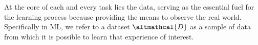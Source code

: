\documentclass[a4paper,12pt,times,numbered,print,index]{Classes/PhDThesisPSnPDF}
\begin{document}
At the core of each and every task lies the data, serving as the essential fuel for the learning process because providing the means to observe the real world.
Specifically in ML, we refer to a dataset $\altmathcal{D}$ as a sample of data from which it is possible to learn that experience of interest.
\end{document}
